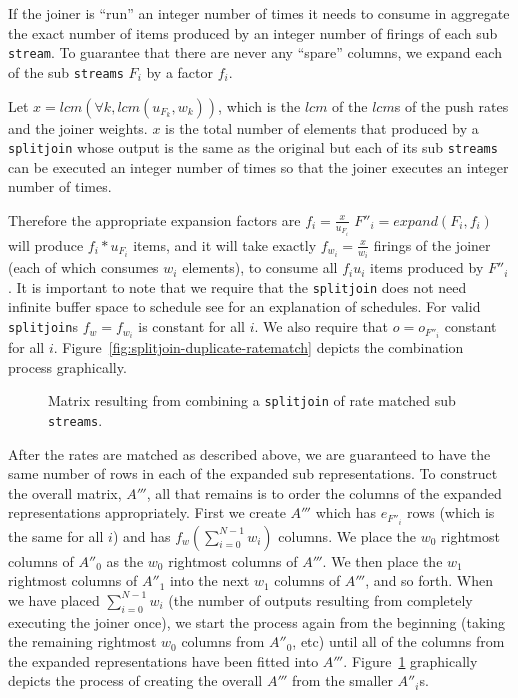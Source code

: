 If the joiner is ``run'' an integer number of times it needs to consume in aggregate
the exact number of items produced by an integer number of firings of
each sub {\tt stream}. To guarantee that there are never any ``spare'' columns,
we expand each of the sub {\tt streams} $F_i$ by a factor $f_i$.

Let $x=lcm(\forall k, lcm(u_{F_k},w_k))$, which is the $lcm$ of the $lcm$s of 
the push rates and the joiner weights. $x$ is the total number of elements that 
produced by a {\tt splitjoin} whose output is the same as the original but each 
of its sub {\tt streams} can be executed an integer number of times so that 
the joiner executes an integer number of times.

Therefore the appropriate expansion factors are  $f_i=\frac{x}{u_{F_i}}$ 
$F''_i = expand(F_i,f_i)$ will produce $f_i*u_{F_i}$ items, and it will take 
exactly $f_{w_i}=\frac{x}{w_i}$ firings of the 
joiner (each of which consumes $w_i$ elements), to consume all $f_iu_i$ items produced by $F''_i$.
It is important to note that we require that the {\tt splitjoin} does not need
infinite buffer space to schedule see \cite{karczma-thesis} for an explanation of schedules. 
For valid {\tt splitjoin}s $f_w=f_{w_i}$ is constant for all $i$. We also require that $o=o_{F''_i}$
constant for all $i$. Figure~\ref{fig:splitjoin-duplicate-ratematch} depicts the 
combination process graphically.

\begin{figure}
\center
\epsfxsize=3.0in
\caption{Matrix resulting from combining a {\tt splitjoin} of rate matched sub {\tt streams}.}
\label{fig:splitjoin-duplicate-matrix}
\end{figure}

After the rates are matched as described above, we are guaranteed to have the same number of rows
in each of the expanded sub representations. To construct the overall matrix, $A'''$, 
all that remains is to order the columns of the expanded representations appropriately. 
First we create $A'''$ which has $e_{F''_i}$ rows (which is the same for all $i$) and has 
$f_w(\sum_{i=0}^{N-1}w_i)$ columns. 
We place the $w_0$ rightmost columns of $A''_0$ as the $w_0$ rightmost 
columns of $A'''$. We then place the $w_1$ rightmost columns of $A''_1$ into the next $w_1$ columns 
of $A'''$, and so forth. When we have placed $\sum_{i=0}^{N-1}w_{i}$ (the number of outputs resulting from 
completely executing the joiner once), we start the process again from the beginning (taking the remaining
rightmost $w_0$ columns from $A''_0$, etc) until all of the columns from the expanded representations have
been fitted into $A'''$. Figure~\ref{fig:splitjoin-duplicate-matrix} graphically depicts the process of 
creating the overall $A'''$ from the smaller $A''_i$s.



